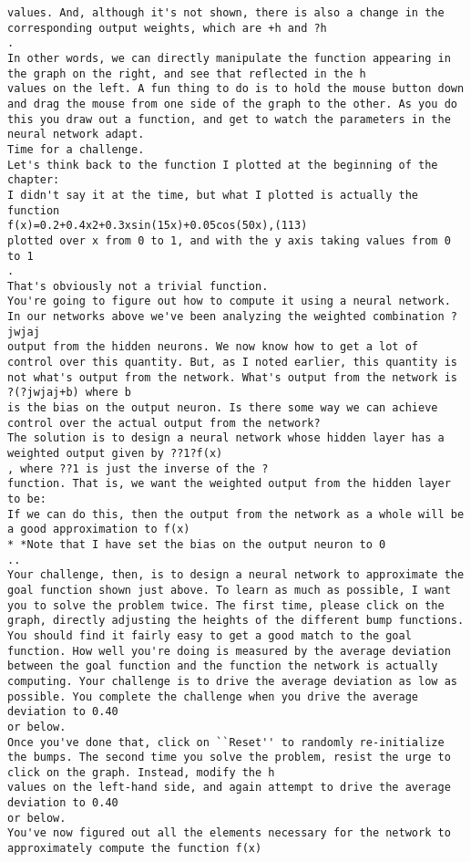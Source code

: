 \begin{lstlisting}
values. And, although it's not shown, there is also a change in the corresponding output weights, which are +h and ?h
.
In other words, we can directly manipulate the function appearing in the graph on the right, and see that reflected in the h
values on the left. A fun thing to do is to hold the mouse button down and drag the mouse from one side of the graph to the other. As you do this you draw out a function, and get to watch the parameters in the neural network adapt.
Time for a challenge.
Let's think back to the function I plotted at the beginning of the chapter:
I didn't say it at the time, but what I plotted is actually the function 
f(x)=0.2+0.4x2+0.3xsin(15x)+0.05cos(50x),(113)
plotted over x from 0 to 1, and with the y axis taking values from 0 to 1
.
That's obviously not a trivial function.
You're going to figure out how to compute it using a neural network.
In our networks above we've been analyzing the weighted combination ?jwjaj
output from the hidden neurons. We now know how to get a lot of control over this quantity. But, as I noted earlier, this quantity is not what's output from the network. What's output from the network is ?(?jwjaj+b) where b
is the bias on the output neuron. Is there some way we can achieve control over the actual output from the network?
The solution is to design a neural network whose hidden layer has a weighted output given by ??1?f(x)
, where ??1 is just the inverse of the ?
function. That is, we want the weighted output from the hidden layer to be:
If we can do this, then the output from the network as a whole will be a good approximation to f(x)
* *Note that I have set the bias on the output neuron to 0
..
Your challenge, then, is to design a neural network to approximate the goal function shown just above. To learn as much as possible, I want you to solve the problem twice. The first time, please click on the graph, directly adjusting the heights of the different bump functions. You should find it fairly easy to get a good match to the goal function. How well you're doing is measured by the average deviation between the goal function and the function the network is actually computing. Your challenge is to drive the average deviation as low as possible. You complete the challenge when you drive the average deviation to 0.40
or below.
Once you've done that, click on ``Reset'' to randomly re-initialize the bumps. The second time you solve the problem, resist the urge to click on the graph. Instead, modify the h
values on the left-hand side, and again attempt to drive the average deviation to 0.40
or below.
You've now figured out all the elements necessary for the network to approximately compute the function f(x)

\end{lstlisting}
